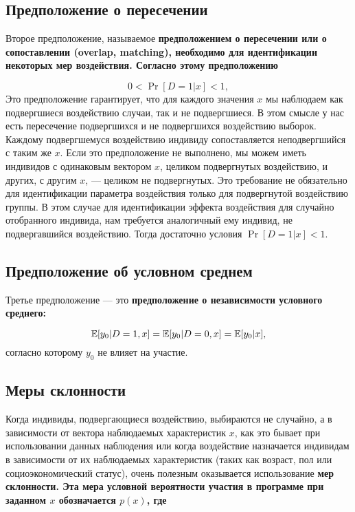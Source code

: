 \subsection{Предположение о пересечении}

Второе предположение, называемое \bfseries предположением о пересечении \mdseries или \bfseries о сопоставлении \mdseries (overlap, matching), необходимо для идентификации некоторых мер воздействия. Согласно этому предположению

\begin{equation}
\label{eq25.6}
0 < \Pr [D = 1| x] < 1, 
\end{equation}
Это предположение гарантирует, что для каждого значения $x$ мы наблюдаем как подвергшиеся воздействию случаи, так и не подвергшиеся. В этом смысле у нас есть пересечение подвергшихся и не подвергшихся воздействию выборок. Каждому подвергшемуся воздействию индивиду сопоставляется неподвергшийся с таким же $x$. Если это предположение не выполнено, мы можем иметь индивидов с одинаковым вектором $x$, целиком подвергнутых воздействию, и других, с другим $x$, --- целиком не подвергнутых. Это требование не обязательно для идентификации параметра воздействия только для подвергнутой воздействию группы. В этом случае для идентификации эффекта воздействия для случайно отобранного индивида, нам требуется аналогичный ему индивид, не подвергавшийся воздействию. Тогда достаточно условия $\Pr [D = 1|x] < 1$. 

\subsection{Предположение об условном среднем}

Третье предположение --- это \bfseries предположение о независимости условного среднего: \mdseries

\begin{equation}
\label{eq25.7}
\mathbb{E}[y_0 | D = 1, x] = \mathbb{E} [y_0 | D = 0, x] = \mathbb{E} [y_0|x], 
\end{equation}
согласно которому $y_0$ не влияет на участие. 

\subsection{Меры склонности}

Когда индивиды, подвергающиеся воздействию, выбираются не случайно, а в зависимости от вектора наблюдаемых характеристик $x$, как это бывает при использовании данных наблюдения или когда воздействие назначается индивидам в зависимости от их наблюдаемых характеристик (таких как возраст, пол или социоэкономический статус), очень полезным оказывается использование \bfseries мер склонности. \mdseries Эта мера условной вероятности участия в программе при заданном $x$ обозначается $p(x)$, где

